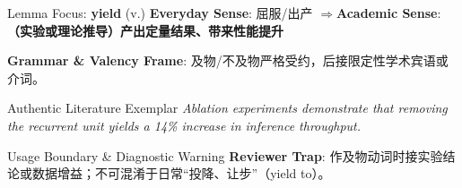 \begin{ConceptBox}{Lemma Focus: \textbf{yield} (v.)}
\textbf{Everyday Sense}: 屈服/出产 \quad$\Longrightarrow$\quad \textbf{Academic Sense}: \textbf{（实验或理论推导）产出定量结果、带来性能提升}\par\vspace{3pt}
\textbf{Grammar \& Valency Frame}: 及物/不及物严格受约，后接限定性学术宾语或介词。\par
\end{ConceptBox}
\begin{ExampleBox}{Authentic Literature Exemplar}
\textit{Ablation experiments demonstrate that removing the recurrent unit yields a 14\% increase in inference throughput.}
\end{ExampleBox}
\begin{TipBox}{Usage Boundary \& Diagnostic Warning}
\textbf{Reviewer Trap}: 作及物动词时接实验结论或数据增益；不可混淆于日常“投降、让步”（yield to）。
\end{TipBox}
\vspace{6pt}
